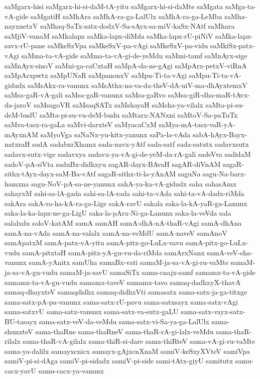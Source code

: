 {saMgarx-hisi
saMgarx-hi-si-daM-tA-yitu
saMgarx-hi-si-daMte
saMgata
saMga-ta-vA-gide
saMgatiH
saMhAra
saMhA-ra-ga-LalUlx
saMhA-ra-ga-LeMba
saMha-nayxnetxV
saMhaq-SaTx-satx-dodxV-Sa-sAyx-sa-miV-kaSx-NAtf
saMhara
saMjiV-vanaM
saMkalapx
saMka-lapx-diMda
saMka-lapx-rU-piNiV
saMka-lapx-savx-rU-pane
saMkeSxVpa
saMkeSxV-pa-vAgi
saMkeSxV-pa-vidu
saMkiSx-patx-vAgi
saMma-ta-vA-gide
saMma-ta-vA-gi-de-yeMdu
saMmi-tamf
saMnAyx-sige
saMnAyx-sinoV
saMni-ga-caCxtaH
saMpA-da-ne-gAgi
saMpArx-petxV-viRnA
saMpArxpwtx
saMpUNaR
saMpanonxV
saMpu-Ti-ta-vAgi
saMpu-Ti-ta-vA-gidudx
saMsAkx-ra-vanunx
saMsAthx-na-va-da-theV-dA-niV-ma-dhAyxtemxV
saMsa-gaR-vA-gali
saMsa-gaR-vanunx
saMsa-gaRvo
saMsa-giR-dha-maR-tAvx-da-jaroV
saMsagoVR
saMsaqSATx
saMshayaH
saMsha-ya-vilalx
saMta-pi-su-deM-budU
saMta-pi-su-vu-deM-budu
saMtarx-NANxni
saMtoV-Sa-paTuTx
saMva-tasx-ra-gaLa
saMvi-darxteV
saMyacaCxM
saMya-mA-tasx-vaR-yA-mAyxnAM
saMyoVga
saNaNx-yu-kitx-yanunx
saPa-la-vAda
sabA-hAyx-Bayx-natxraH
sadA
sadabxrXhamx
sada-navx-yAtf
sada-satf
sada-satutx
sadavxsutx
sadavx-sutx-vige
sadavxya
sadavx-ya-vA-gi-de-yeM-da-rA-gali
sadeVva
sadidaM
sadoV-pA-siVta
saduBx-didhxyu
sagAR-dayx-BAvaH
sagAR-diVnAM
sagaR-sithx-tAyx-dayx-saM-Ba-vAtf
sagaR-sithx-ti-la-yAnAM
saguNa
sagu-Na-barx-hamxna
sagu-NoV-pA-sa-ne-yanunx
sahA-ya-ka-vA-gidudx
saha
sahasAmx
sahayxM
sahi-sa-lA-gada
sahi-sa-lA-rada
sahi-ta-vAda
sahi-ta-vA-dadx-riMda
sakAra
sakA-ra-ha-kA-ra-ga-Lige
sakA-ravU
sakala
saka-la-kA-yaR-ga-Lanunx
saka-la-ka-lapx-ne-ga-LigU
saka-la-pArx-Ni-ga-Lanunx
saka-la-veVda
sala
salalxdu
saloV-katAM
samA
samAH
samA-dhA-nA-thaR-vAgi
samA-dhAna
samA-na-vAda
samA-na-valalx
samA-na-veMdU
samA-naveV
samAnoV
samApatxM
samA-patx-vA-yitu
samA-pitx-go-LuLx-vavu
samA-pitx-go-LuLx-vudu
samA-pitxtaH
samA-pitx-yA-gu-vu-da-riMda
samArxNanx
samA-veV-sha-vanunx
samA-yAnitx
samUha
samaBx-vati
samaM-ja-sa-vA-gi-ru-vaMte
samaM-ja-sa-vA-gu-vudu
samaM-ja-savU
samaSiTx
sama-cnajx-samf
samamx-ta-vA-gide
samamx-ta-vA-gu-vudu
samamx-taveV
samamx-tavo
samaq-dadhxyX-thavA
samaq-dhayxteV
samaqdidhx
samaq-didhxVti
samasatx
sama-satx-ja-ga-titxge
sama-satx-pA-pa-vanunx
sama-satx-rU-pavu
sama-satxsayx
sama-satx-vAgi
sama-satxvU
sama-satx-vanunx
sama-satx-va-sutx-gaLU
sama-satx-vayx-satx-BU-tasayx
sama-satx-veV-da-veMdu
sama-satx-vi-Sa-ya-ga-LalUlx
sama-shunxteV
sama-thaRne
sama-thaRneV
sama-thaR-rA-gi-lalx-veMdu
sama-thaR-rilalx
sama-thaR-vA-gilalx
sama-thiR-si-dare
sama-thiRteV
sama-vA-gi-ru-vaMte
sama-ya-dalilx
samayxcnicx
samayx-gAjxcnXnaM
samiV-keSxyXVteV
samiVpa
samiV-pi-si-dAga
samiV-pi-sidadx
samiV-pi-side
sami-tAtx-giyU
samitutx
samu-cacx-yavU
samu-cacx-ya-vanunx
}
